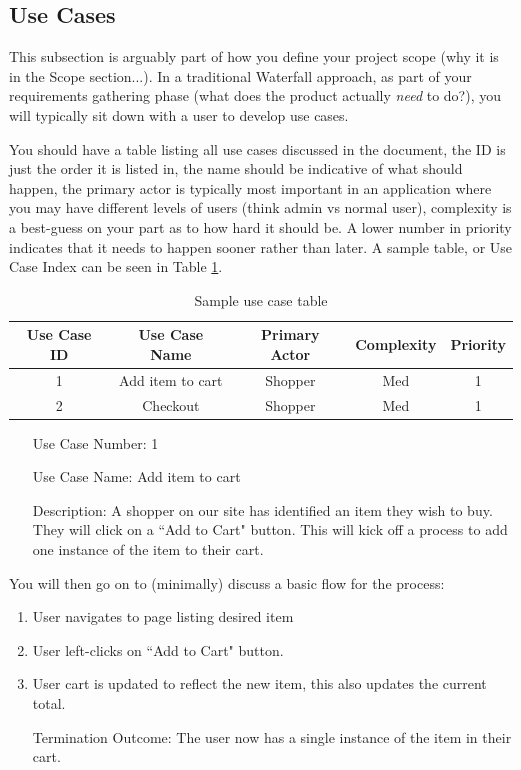 \documentclass[10pt,conference,onecolumn,compsoc]{IEEEtran}
\begin{document}
\subsection{Use Cases}
This subsection is arguably part of how you define your project scope (why it is in the Scope section...).  In a traditional Waterfall approach, as part of your requirements gathering phase (what does the product actually \emph{need} to do?), you will typically sit down with a user to develop use cases.

You should have a table listing all use cases discussed in the document, the ID is just the order it is listed in, the name should be indicative of what should happen, the primary actor is typically most important in an application where you may have different levels of users (think admin vs normal user), complexity is a best-guess on your part as to how hard it should be.  A lower number in priority indicates that it needs to happen sooner rather than later.  A sample table, or Use Case Index can be seen in Table \ref{tab:useCaseIndex}.




\begin{table}
\centering
\begin{tabular}{|c|c|c|c|c|}
\hline
Use Case ID & Use Case Name & Primary Actor & Complexity & Priority \\
\hline \hline
1 & Add item to cart & Shopper & Med & 1\\
\hline
2 & Checkout & Shopper & Med & 1\\
\hline

\end{tabular}
\caption{Sample use case table}
\label{tab:useCaseIndex}
\end{table}


\begin{itemize}
\item[Use Case Number:] 1
\item[Use Case Name:] Add item to cart
\item[Description:] A shopper on our site has identified an item they wish to buy.  They will click on a ``Add to Cart" button.  This will kick off a process to add one instance of the item to their cart.
\end{itemize}

You will then go on to (minimally) discuss a basic flow for the process:

\begin{enumerate}
\item User navigates to page listing desired item
\item User left-clicks on ``Add to Cart" button.
\item User cart is updated to reflect the new item, this also updates the current total.
\item[Termination Outcome:] The user now has a single instance of the item in their cart.
\end{enumerate}
\end{document}
